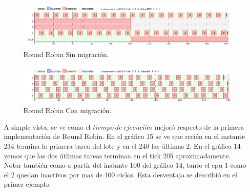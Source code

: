 \begin{figure}[h]
  \includegraphics[width=\textwidth]{../ej8/rr24task.png}
  \caption{Round Robin Sin migración.}
\end{figure}

\begin{figure}[h]
  \includegraphics[width=\textwidth]{../ej8/rr4task.png}
  \caption{Round Robin Con migración.}
\end{figure}


A simple vista, se ve como el $tiempo\ de\ ejecución$ mejoró respecto de la primera implementación de Round Robin. En el gráfico 15 
se ve que recién en el instante 234 termina la primera tarea del lote y en el 240 las últimas 2. En el gráfico 14 vemos que las dos útlimas tareas
terminan en el tick 205 aproximadamente. 
Notar también como a partir del instante 100 del gráfico 14, tanto el cpu 1 como el 2 quedan inactivos por mas de 100 ciclos. Esta desventaja se describió en el 
primer ejemplo.



